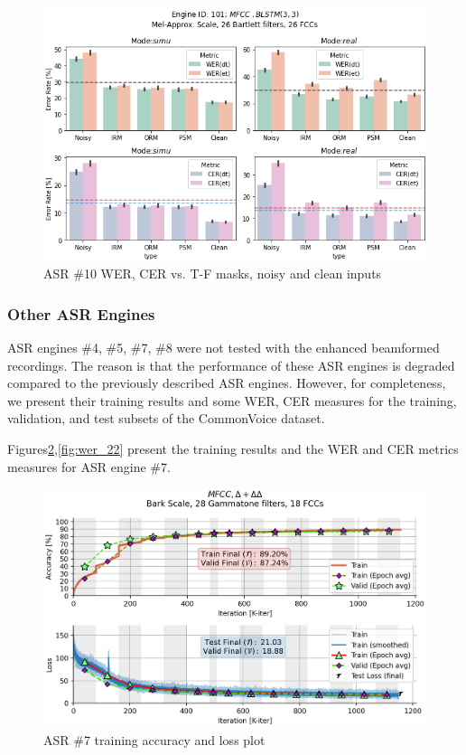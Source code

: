 \begin{figure}[H]
    \centering
    \includegraphics[width=0.95\linewidth]{ASR/images/asr101_wer_masks.png}
    \caption{ASR \#10 WER, CER vs. T-F masks, noisy and clean inputs }\label{fig:asr101_wer_masks}
\end{figure}


\subsubsection{Other ASR Engines}
ASR engines \#4, \#5, \#7, \#8
were not tested with the enhanced beamformed recordings.
The reason is that the performance of these ASR engines
is degraded compared to the previously described ASR engines.
However, for completeness, we present their training results
and some WER, CER measures for the training, validation,
and test subsets of the CommonVoice dataset.

\bigskip

Figures\;\ref{fig:asr_22},\;\ref{fig:wer_22}
present the training results and the WER and CER
metrics measures for ASR engine \#7.

\begin{figure}[H]
    \centering
    \includegraphics[width=0.95\linewidth]{Experiments/images/asr_22}
    \caption{ASR \#7 training accuracy and loss plot}\label{fig:asr_22}
\end{figure}


